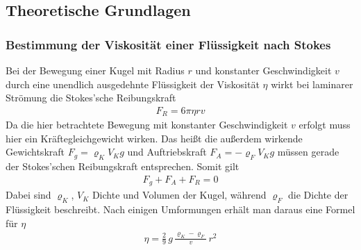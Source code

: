 \documentclass[12pt,a4paper,german]{scrartcl}
\numberwithin{equation}{section}
\begin{document}
  \subsection{Theoretische Grundlagen}
  \subsubsection{Bestimmung der Viskosität einer Flüssigkeit nach Stokes}
  Bei der Bewegung einer Kugel mit Radius $r$ und konstanter Geschwindigkeit $v$ durch eine unendlich ausgedehnte Flüssigkeit der Viskosität $\eta$ wirkt bei laminarer Strömung die Stokes'sche Reibungskraft
  \begin{align}
    F_R = 6 \pi \eta r v
    \label{eq_theo_stokes_friction}
  \end{align}
  Da die hier betrachtete Bewegung mit konstanter Geschwindigkeit $v$ erfolgt muss hier ein Kräftegleichgewicht wirken.
  Das heißt die außerdem wirkende Gewichtskraft $F_g = \varrho_K V_K g$ und Auftriebskraft $F_A = -\varrho_F V_K g$ müssen gerade der Stokes'schen Reibungskraft entsprechen. Somit gilt
  \begin{align}
    F_g + F_A + F_R = 0
    \label{eq_theo_stokes_force_equilibrium}
  \end{align}
  Dabei sind $\varrho_K$, $V_K$ Dichte und Volumen der Kugel, während $\varrho_F$ die Dichte der Flüssigkeit beschreibt.
  Nach einigen Umformungen erhält man daraus eine Formel für $\eta$
  \begin{align}
    \eta = \frac{2}{9} \, g \, \frac{\varrho_K - \varrho_F}{v} \, r^2
    \label{eq_theo_stokes_viscosity}
  \end{align}
\end{document}
